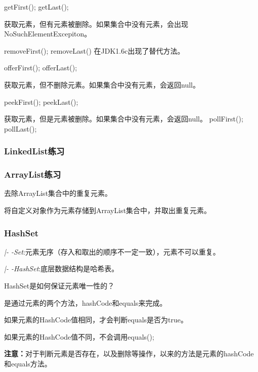 \documentclass[UTF8]{ctexart}
\begin{document}
getFirst();
getLast();

获取元素，但有元素被删除。如果集合中没有元素，会出现NoSuchElementExcepiton。

removeFirst();
removeLast()
在JDK1.6c出现了替代方法。

offerFirst();
offerLast();

获取元素，但不删除元素。如果集合中没有元素，会返回null。

peekFirst();
peekLast();

获取元素，但是元素被删除。如果集合中没有元素，会返回null。
pollFirst();
pollLast();



\subsubsection{LinkedList练习}



\subsubsection{ArrayList练习}

\textbullet 去除ArrayList集合中的重复元素。



\textbullet 将自定义对象作为元素存储到ArrayList集合中，并取出重复元素。



\subsubsection{HashSet}

\textit{|- -Set}:元素无序（存入和取出的顺序不一定一致），元素不可以重复。

\qquad \textit{|- -HashSet}:底层数据结构是哈希表。

\qquad \qquad HashSet是如何保证元素唯一性的？

\qquad \qquad 是通过元素的两个方法，hashCode和equals来完成。

\qquad \qquad 如果元素的HashCode值相同，才会判断equals是否为true。

\qquad \qquad 如果元素的HashCode值不同，不会调用equals();

\qquad \qquad \textbf{注意：}对于判断元素是否存在，以及删除等操作，以来的方法是元素的hashCode和equals方法。
\end{document}
